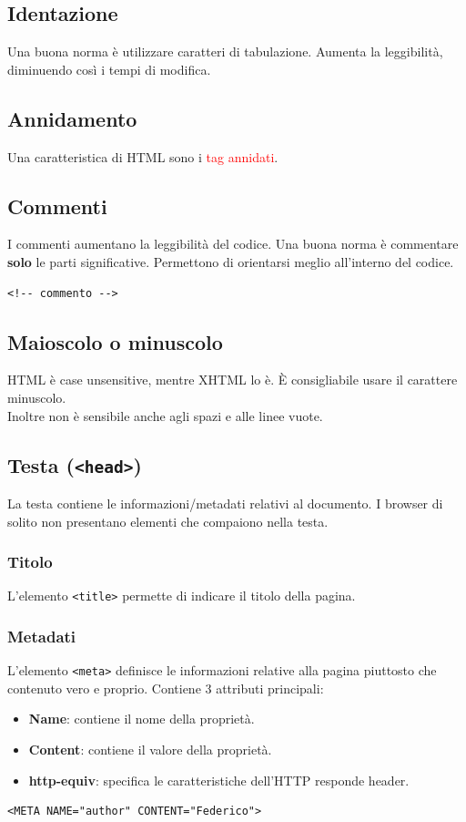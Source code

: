 \documentclass{article}
\begin{document}
\subsection{Identazione}
Una buona norma è utilizzare caratteri di tabulazione. Aumenta la leggibilità, diminuendo così i tempi di modifica.
\subsection{Annidamento}
Una caratteristica di HTML sono i \textcolor{red}{tag annidati}.
\subsection{Commenti}
I commenti aumentano la leggibilità del codice. Una buona norma è commentare \textbf{solo} le parti significative. Permettono di orientarsi meglio all'interno del codice.
\begin{lstlisting}[style=htmlstyle]
<!-- commento -->
\end{lstlisting}
\subsection{Maioscolo o minuscolo}
HTML è case unsensitive, mentre XHTML lo è. È consigliabile usare il carattere minuscolo.
\\ Inoltre non è sensibile anche agli spazi e alle linee vuote.
\subsection{Testa (\texttt{<head>})}
La testa contiene le informazioni/metadati relativi al documento. I browser di solito non presentano elementi che compaiono nella testa.
\subsubsection{Titolo}
L'elemento \texttt{<title>} permette di indicare il titolo della pagina.
\subsubsection{Metadati}
L'elemento \texttt{<meta>} definisce le informazioni relative alla pagina piuttosto che contenuto vero e proprio. Contiene 3 attributi principali:
\begin{itemize}
    \item \textbf{Name}: contiene il nome della proprietà.
    \item \textbf{Content}: contiene il valore della proprietà.
    \item \textbf{http-equiv}: specifica le caratteristiche dell'HTTP responde header.
\end{itemize}
\begin{lstlisting}[style=htmlstyle]
<META NAME="author" CONTENT="Federico">
\end{lstlisting}
\end{document}
